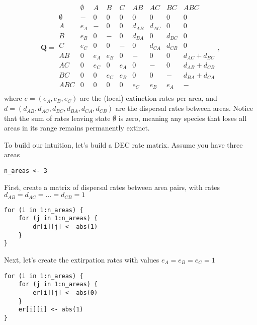 \[
\textbf{Q} = 
	\begin{array}{c|cccccccc}
		& \emptyset & A & B & C & AB & AC & BC & ABC \\
		\hline
		\emptyset 	& - 	& 0 	& 0 	& 0 		& 0			& 0 		& 0 		& 0 \\
		A 			& e_A 	& - 	& 0 	& 0 		& d_{AB}	& d_{AC} 	& 0 		& 0 \\
		B 			& e_B 	& 0 	& - 	& 0 		& d_{BA}	& 0 		& d_{BC} 	& 0 \\
		C 			& e_C 	& 0 	& 0 	& - 		& 0 		& d_{CA} 	& d_{CB} 	& 0 \\
		AB 			& 0 	& e_A 	& e_B 	& 0 		& -			& 0 		& 0 		& d_{AC} + d_{BC} \\
		AC 			& 0 	& e_C 	& 0 	& e_A 		& 0			& - 		& 0 		& d_{AB} + d_{CB} \\
		BC 			& 0 	& 0 	& e_C 	& e_B 		& 0			& 0 		& - 		& d_{BA} + d_{CA} \\
		ABC 		& 0 	& 0 	& 0 	& 0 		& e_C 		& e_B 		& e_A 		& - \\								
	\end{array},
\]
where $e = ( e_A, e_B, e_C )$ are the (local) extinction rates per area, and $d = ( d_{AB}, d_{AC}, d_{BC}, d_{BA}, d_{CA}, d_{CB})$ are the dispersal rates between areas.
Notice that the sum of rates leaving state $\emptyset$ is zero, meaning any species that loses all areas in its range remains permanently extinct.

To build our intuition, let's build a DEC rate matrix.
Assume you have three areas

\begin{snugshade}
\begin{lstlisting}
n_areas <- 3
\end{lstlisting}
\end{snugshade}

First, create a matrix of dispersal rates between area pairs, with rates $d_{AB} = d_{AC} = \ldots = d_{CB} = 1$

\begin{snugshade}
\begin{lstlisting}
for (i in 1:n_areas) {
    for (j in 1:n_areas) {
        dr[i][j] <- abs(1)
    }
}
\end{lstlisting}
\end{snugshade}

Next, let's create the extirpation rates with values $e_A=e_B=e_C=1$

\begin{snugshade}
\begin{lstlisting}
for (i in 1:n_areas) {
    for (j in 1:n_areas) {
        er[i][j] <- abs(0)
    }
    er[i][i] <- abs(1) 
}
\end{lstlisting}
\end{snugshade}

